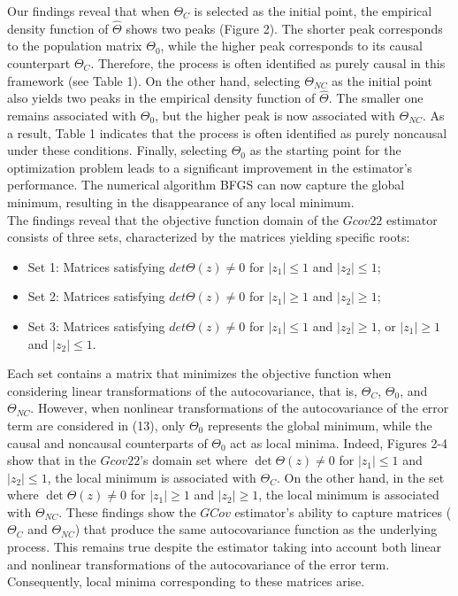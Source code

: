 \documentclass[<1p>]{elsarticle} %
\begin{document}
\indent Our findings reveal that when $\Theta_{C}$ is selected as the initial point, the empirical density function of $\hat{\Theta}$ shows two peaks (Figure 2). The shorter peak corresponds to the population matrix $\Theta_0$, while the higher peak corresponds to its causal counterpart $\Theta_{C}$. Therefore, the process is often identified as purely causal in this framework (see Table 1). On the other hand, selecting $\Theta_{NC}$ as the initial point also yields two peaks in the empirical density function of $\hat{\Theta}$. The smaller one remains associated with $\Theta_0$, but the higher peak is now associated with $\Theta_{NC}$. As a result, Table 1 indicates that the process is often identified as purely noncausal under these conditions. Finally, selecting $\Theta_0$ as the starting point for the optimization problem leads to a significant improvement in the estimator's performance. The numerical algorithm BFGS can now capture the global minimum, resulting in the disappearance of any local minimum.\\
\indent The findings reveal that the objective function domain of the $Gcov22$ estimator consists of three sets, characterized by the matrices yielding specific roots:
\begin{itemize}
    \item Set 1: Matrices satisfying $det \Theta(z) \neq 0$ for $|z_{1}| \leq 1$ and $|z_{2}| \leq 1$;
    \item Set 2: Matrices satisfying $det \Theta(z) \neq 0$ for $|z_{1}| \geq 1$ and $|z_{2}| \geq 1$;
    \item Set 3: Matrices satisfying $det \Theta(z) \neq 0$ for $|z_{1}| \leq 1$ and $|z_{2}| \geq 1$, or $|z_{1}| \geq 1$ and $|z_{2}| \leq 1$.
\end{itemize}
Each set contains a matrix that minimizes the objective function when considering linear transformations of the autocovariance, that is, $\Theta_C$, $\Theta_0$, and $\Theta_{NC}$. However, when nonlinear transformations of the autocovariance of the error term are considered in (13), only $\Theta_0$ represents the global minimum, while the causal and noncausal counterparts of $\Theta_0$ act as local minima. Indeed, Figures 2-4 show that in the $Gcov22$'s domain set where $\det \Theta(z) \neq 0$ for $|z_1| \leq 1$ and $|z_2| \leq 1$, the local minimum is associated with $\Theta_{C}$. On the other hand, in the set where $\det \Theta(z) \neq 0$ for $|z_1| \geq 1$ and $|z_2| \geq 1$, the local minimum is associated with $\Theta_{NC}$. These findings show the $GCov$ estimator's ability to capture matrices ($\Theta_C$ and $\Theta_{NC}$) that produce the same autocovariance function as the underlying process. This remains true despite the estimator taking into account both linear and nonlinear transformations of the autocovariance of the error term. Consequently, local minima corresponding to these matrices arise.\\ 
\end{document}
